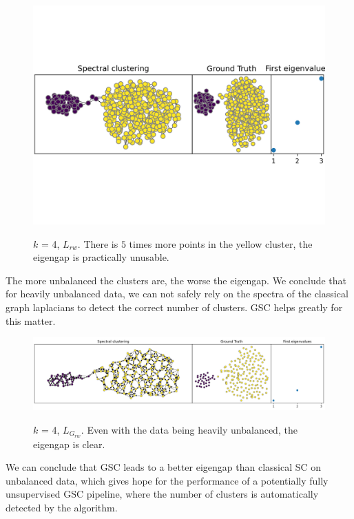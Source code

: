 \documentclass[a4paper,12pt]{article}
\theoremstyle{definition}
\theoremstyle{plain}
\begin{document}
\begin{figure}[H]
	\centering
	\includegraphics[width=0.6\linewidth]{figures/mid_asym_blobs_rw}
	\label{fig:4x_asym_blobs_rw}
	\caption{$k$ = 4, $L_{rw}$. There is $5$ times more points in the yellow cluster, the eigengap is practically unusable.}
\end{figure}
The more unbalanced the clusters are, the worse the eigengap. We conclude that for heavily unbalanced data, we can not safely rely on the spectra of the classical graph laplacians to detect the correct number of clusters.
GSC helps greatly for this matter.
\begin{figure}[H]
	\centering
	\includegraphics[width=0.7\linewidth]{figures/mid_asym_blobs_g_rw}
	\label{fig:mid_asym_blobs_g_rw}
	\caption{$k$ = 4, $L_{G_{rw}}$. Even with the data being heavily unbalanced, the eigengap is clear.}
\end{figure}
We can conclude that GSC leads to a better eigengap than classical SC on unbalanced data, which gives hope for the performance of a potentially fully unsupervised GSC pipeline, where the number of clusters is automatically detected by the algorithm.
\end{document}
